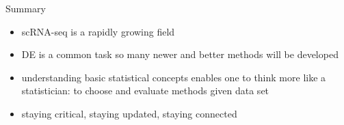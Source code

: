 \documentclass{beamer}\usepackage[]{graphicx}\usepackage[]{color}
\begin{document}
\begin{frame}
\begin{block}{Summary}
\begin{itemize}
\scriptsize
\item scRNA-seq is a rapidly growing field
\item DE is a common task so many newer and better methods will be developed
\item understanding basic statistical concepts enables one to think more like a statistician: to choose and evaluate methods given data set
\item staying critical, staying updated, staying connected
\end{itemize}
\end{block}
\end{frame}



\end{document}
